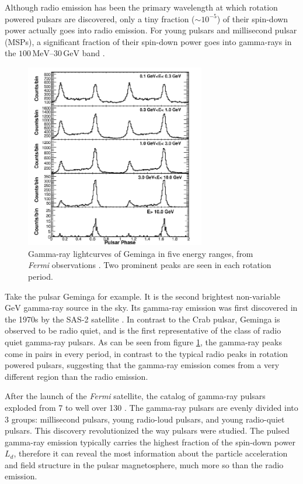 Although radio emission has been the primary wavelength at which rotation
powered pulsars are discovered, only a tiny fraction ($\sim 10^{-5}$) of their
spin-down power actually goes into radio emission. For young pulsars and
millisecond pulsar (MSPs), a significant fraction of their spin-down power goes
into gamma-rays in the $100\,\mathrm{MeV}$--$30\,\mathrm{GeV}$ band \citep[see
e.g.][]{abdo_fermi_2010}.

\begin{figure}[h]
  \centering
  \includegraphics[width=0.7\textwidth]{pics/intro/geminga2.png}
  \caption[Gamma-ray lightcurves of Geminga]{Gamma-ray lightcurves of Geminga in
    five energy ranges, from {\it Fermi} observations
    \citep{abdo_fermi-lat_2010}. Two prominent peaks are seen in each rotation
    period.}
  \label{fig:geminga}
\end{figure}

Take the pulsar Geminga for example. It is the second brightest non-variable
$\mathrm{GeV}$ gamma-ray source in the sky. Its gamma-ray emission was first
discovered in the 1970s by the SAS-2 satellite
\citep{fichtel_high-energy_1975,kniffen_distribution_1975}. In contrast to the
Crab pulsar, Geminga is observed to be radio quiet, and is the first
representative of the class of radio quiet gamma-ray pulsars. As can be seen
from figure \ref{fig:geminga}, the gamma-ray peaks come in pairs in every
period, in contrast to the typical radio peaks in rotation powered pulsars,
suggesting that the gamma-ray emission comes from a very different region than
the radio emission.

After the launch of the {\it Fermi} satellite, the catalog of gamma-ray pulsars
exploded from 7 to well over 130 \citep{abdo_first_2010,abdo_second_2013}. The
gamma-ray pulsars are evenly divided into 3 groups: millisecond pulsars, young
radio-loud pulsars, and young radio-quiet pulsars. This discovery revolutionized
the way pulsars were studied. The pulsed gamma-ray emission typically carries
the highest fraction of the spin-down power $L_{d}$, therefore it can reveal the
most information about the particle acceleration and field structure in the
pulsar magnetosphere, much more so than the radio emission.

